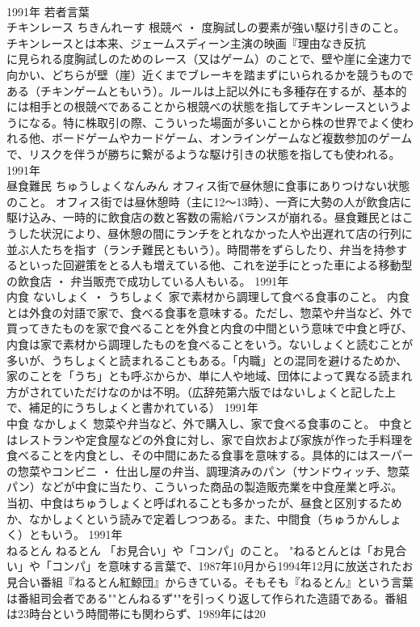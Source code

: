 \documentclass[8pt]{extreport}
\begin{document}
\begin{CJK}{UTF8}{min}
\\	1991年	若者言葉	
\\	チキンレース	ちきんれーす	根競べ ・ 度胸試しの要素が強い駆け引きのこと。	チキンレースとは本来、ジェームスディーン主演の映画『理由なき反抗 
\\	に見られる度胸試しのためのレース（又はゲーム）のことで、壁や崖に全速力で向かい、どちらが壁（崖）近くまでブレーキを踏まずにいられるかを競うものである（チキンゲームともいう）。ルールは上記以外にも多種存在するが、基本的には相手との根競べであることから根競べの状態を指してチキンレースというようになる。特に株取引の際、こういった場面が多いことから株の世界でよく使われる他、ボードゲームやカードゲーム、オンラインゲームなど複数参加のゲームで、リスクを伴うが勝ちに繋がるような駆け引きの状態を指しても使われる。	1991年	
\\	昼食難民	ちゅうしょくなんみん	オフィス街で昼休憩に食事にありつけない状態のこと。	オフィス街では昼休憩時（主に12～13時）、一斉に大勢の人が飲食店に駆け込み、一時的に飲食店の数と客数の需給バランスが崩れる。昼食難民とはこうした状況により、昼休憩の間にランチをとれなかった人や出遅れて店の行列に並ぶ人たちを指す（ランチ難民ともいう）。時間帯をずらしたり、弁当を持参するといった回避策をとる人も増えている他、これを逆手にとった車による移動型の飲食店 ・ 弁当販売で成功している人もいる。	1991年	
\\	内食	ないしょく ・ うちしょく	家で素材から調理して食べる食事のこと。	内食とは外食の対語で家で、食べる食事を意味する。ただし、惣菜や弁当など、外で買ってきたものを家で食べることを外食と内食の中間という意味で中食と呼び、内食は家で素材から調理したものを食べることをいう。ないしょくと読むことが多いが、うちしょくと読まれることもある。「内職」との混同を避けるためか、家のことを「うち」とも呼ぶからか、単に人や地域、団体によって異なる読まれ方がされていただけなのかは不明。（広辞苑第六版ではないしょくと記した上で、補足的にうちしょくと書かれている）	1991年	
\\	中食	なかしょく	惣菜や弁当など、外で購入し、家で食べる食事のこと。	中食とはレストランや定食屋などの外食に対し、家で自炊および家族が作った手料理を食べることを内食とし、その中間にあたる食事を意味する。具体的にはスーパーの惣菜やコンビニ ・ 仕出し屋の弁当、調理済みのパン（サンドウィッチ、惣菜パン）などが中食に当たり、こういった商品の製造販売業を中食産業と呼ぶ。当初、中食はちゅうしょくと呼ばれることも多かったが、昼食と区別するためか、なかしょくという読みで定着しつつある。また、中間食（ちゅうかんしょく）ともいう。	1991年	
\\	ねるとん	ねるとん	「お見合い」や「コンパ」のこと。	"ねるとんとは「お見合い」や「コンパ」を意味する言葉で、1987年10月から1994年12月に放送されたお見合い番組『ねるとん紅鯨団』からきている。そもそも『ねるとん』という言葉は番組司会者である""とんねるず""を引っくり返して作られた造語である。番組は23時台という時間帯にも関わらず、1989年には20

\end{CJK}
\end{document}
